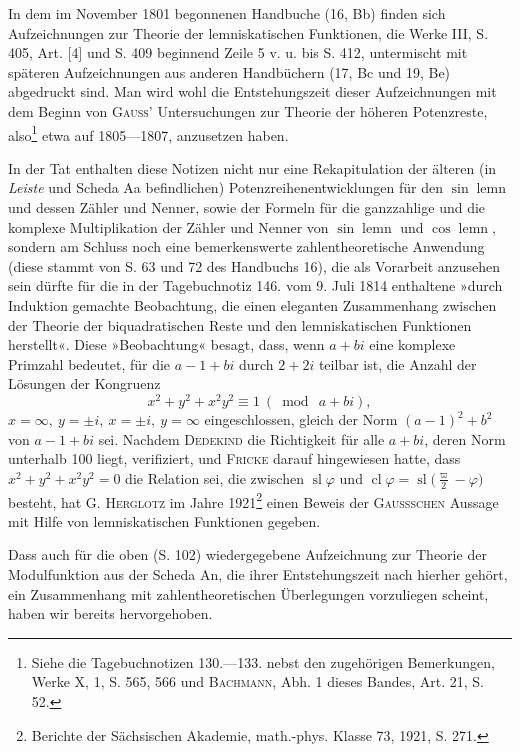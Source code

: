 In dem im November 1801 begonnenen Handbuche (16, Bb) finden sich
Aufzeichnungen zur Theorie der lemniskatischen Funktionen, die Werke III,
S. 405, Art. [4] und S. 409 beginnend Zeile 5 v. u. bis S. 412, untermischt
mit späteren Aufzeichnungen aus anderen Handbüchern (17, Bc und 19, Be)
abgedruckt sind. Man wird wohl die Entstehungszeit dieser Aufzeichnungen mit
dem Beginn von \textsc{Gauss’} Untersuchungen zur Theorie der höheren Potenzreste,
also\footnote{Siehe die Tagebuchnotizen 130.—133. nebst den zugehörigen Bemerkungen, Werke X, 1, S. 565, 566 und \textsc{Bachmann}, Abh. 1 dieses Bandes, Art. 21, S. 52.} etwa auf 1805—1807, anzusetzen haben.\par
\HistoricalFoot{}{16\textsuperscript{*}}
\clearpage{}
In der Tat enthalten diese Notizen nicht nur eine Rekapitulation der
älteren (in \textit{Leiste} und Scheda Aa befindlichen) Potenzreihenentwicklungen für
den \(\sin\operatorname{lemn}\) und dessen Zähler und Nenner, sowie der Formeln für die ganzzahlige
und die komplexe Multiplikation der Zähler und Nenner von \(\sin\operatorname{lemn}\)
und \(\cos\operatorname{lemn}\), sondern am Schluss noch eine bemerkenswerte zahlentheoretische
Anwendung (diese stammt von S. 63 und 72 des Handbuchs 16), die als
Vorarbeit anzusehen sein dürfte für die in der Tagebuchnotiz 146. vom 9. Juli
1814 enthaltene »durch Induktion gemachte Beobachtung, die einen eleganten
Zusammenhang zwischen der Theorie der biquadratischen Reste und den
lemniskatischen Funktionen herstellt«. Diese »Beobachtung« besagt, dass, wenn
\(a+bi\) eine komplexe Primzahl bedeutet, für die \(a-1+bi\) durch \(2+2i\) teilbar
ist, die Anzahl der Lösungen der Kongruenz
\[
x^2+y^2+x^2y^2\equiv1\ (\bmod\ a+bi),
\]
\(x=\infty,\ y=\pm i,\ x=\pm i,\ y=\infty\) eingeschlossen, gleich der Norm \((a-1)^2+b^2\)
von \(a-1+bi\) sei. Nachdem \textsc{Dedekind} die Richtigkeit für alle \(a+bi\), deren
Norm unterhalb 100 liegt, verifiziert, und \textsc{Fricke} darauf hingewiesen hatte,
dass \(x^2+y^2+x^2y^2=0\) die Relation sei, die zwischen \(\operatorname{sl}\varphi\) und \(\operatorname{cl}\varphi=\operatorname{sl}\bigl(\frac{\varpi}{2}-\varphi\bigr)\)
besteht, hat G. \textsc{Herglotz} im Jahre 1921\footnote{Berichte der Sächsischen Akademie, math.-phys. Klasse 73, 1921, S. 271.} einen Beweis der \textsc{Gaussschen} Aussage
mit Hilfe von lemniskatischen Funktionen gegeben.

Dass auch für die oben (S. 102) wiedergegebene Aufzeichnung zur Theorie
der Modulfunktion aus der Scheda An, die ihrer Entstehungszeit nach hierher
gehört, ein Zusammenhang mit zahlentheoretischen Überlegungen vorzuliegen
scheint, haben wir bereits hervorgehoben.

